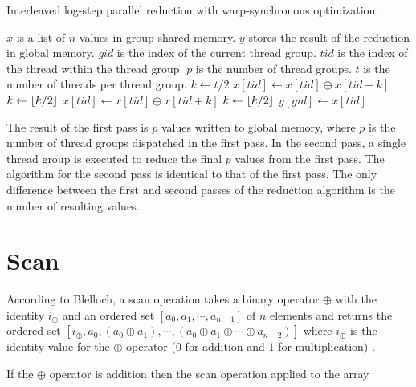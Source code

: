 \begin{algorithm}[H]
\caption{Interleaved log-step parallel reduction with warp-synchronous optimization.}
\label{alg:Log-Step-Reduction-WS}
\begin{algorithmic}[1]
\Require $x$ is a list of $n$ values in group shared memory.
\Require $y$ stores the result of the reduction in global memory.
\Require $gid$ is the index of the current thread group.
\Require $tid$ is the index of the thread within the thread group.
\Require $p$ is the number of thread groups.
\Require $t$ is the number of threads per thread group.
\State $k \gets t/2$
\State $x[tid] \gets x[tid] \oplus x[tid+k]$
\EndIf
\State {}
\State $k \gets \lfloor k/2\rfloor$
\EndWhile
{}
\State $x[tid] \gets x[tid] \oplus x[tid+k]$
\State $k \gets \lfloor k/2\rfloor$
\EndWhile
\EndIf
{}
\State $y[gid] \gets x[tid]$
\EndIf
\EndFunction
\end{algorithmic}
\end{algorithm}

The result of the first pass is $p$ values written to global memory, where $p$ is the number of thread groups dispatched in the first pass. In the second pass, a single thread group is executed to reduce the final $p$ values from the first pass. The algorithm for the second pass is identical to that of the first pass. The only difference between the first and second passes of the reduction algorithm is the number of resulting values.

\section{Scan}
\label{sec:Scan}

According to Blelloch, a scan operation takes a binary operator $\oplus$ with the identity $i_{\oplus}$ and an ordered set $[a_0,a_1,\cdots,a_{n-1}]$ of $n$ elements and returns the ordered set $[i_{\oplus},a_0,(a_0\oplus a_1),\cdots,(a_0\oplus a_1\oplus\cdots\oplus a_{n-2})]$ where $i_{\oplus}$ is the identity value for the $\oplus$ operator ($0$ for addition and $1$ for multiplication) \parencite{35_blelloch_1989}. 

If the $\oplus$ operator is addition then the scan operation applied to the array

\begin{equation}
[2, 1, 2, 3, 4, 8, 13, 21]
\end{equation}

